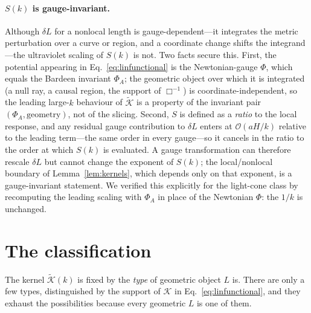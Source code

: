 \documentclass[twocolumn,10pt]{article}
\begin{document}
\paragraph{$S(k)$ is gauge-invariant.}
Although $\delta L$ for a nonlocal length is gauge-dependent---it integrates the
metric perturbation over a curve or region, and a coordinate change shifts the
integrand---the ultraviolet scaling of $S(k)$ is not. Two facts secure this.
First, the potential appearing in Eq.~\eqref{eq:linfunctional} is the
Newtonian-gauge $\Phi$, which equals the Bardeen invariant $\Phi_A$; the
geometric object over which it is integrated (a null ray, a causal region, the
support of $\Box^{-1}$) is coordinate-independent, so the leading large-$k$
behaviour of $\widetilde{\mathcal K}$ is a property of the invariant pair
$(\Phi_A,\text{geometry})$, not of the slicing. Second, $S$ is defined as a
\emph{ratio} to the local response, and any residual gauge contribution to
$\delta L$ enters at $\mathcal{O}(aH/k)$ relative to the leading term---the same
order in every gauge---so it cancels in the ratio to the order at which $S(k)$
is evaluated. A gauge transformation can therefore rescale $\delta L$ but cannot
change the exponent of $S(k)$; the local/nonlocal boundary of
Lemma~\ref{lem:kernels}, which depends only on that exponent, is a
gauge-invariant statement. We verified this explicitly for the light-cone class
by recomputing the leading scaling with $\Phi_A$ in place of the Newtonian
$\Phi$: the $1/k$ is unchanged.

\section{The classification}
\label{sec:partition}

The kernel $\widetilde{\mathcal K}(k)$ is fixed by the \emph{type} of geometric
object $L$ is. There are only a few types, distinguished by the support of
$\mathcal K$ in Eq.~\eqref{eq:linfunctional}, and they exhaust the possibilities
because every geometric $L$ is one of them.
\end{document}
